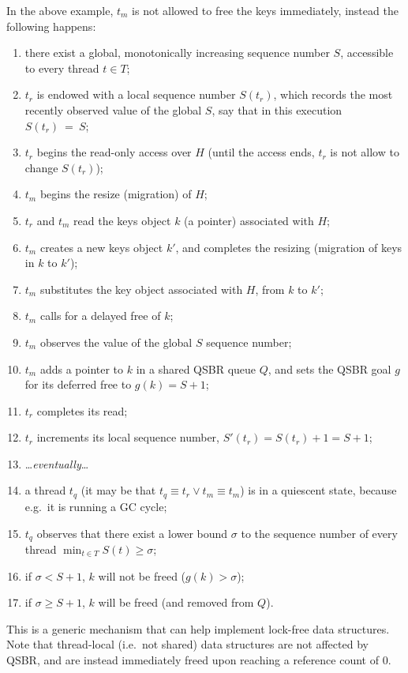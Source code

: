 In the above example, $t_m$ is not allowed to free the keys immediately, instead the following happens:
\begin{enumerate}
    \item there exist a global, monotonically increasing sequence number $S$, accessible to every thread $t \in T$;
    \item $t_r$ is endowed with a local sequence number $S(t_r)$, which records the most recently observed value of the global $S$, say that in this execution $S(t_r)~=~S$;
    \item $t_r$ begins the read-only access over $H$ (until the access ends, $t_r$ is not allow to change $S(t_r)$);
    \item $t_m$ begins the resize (migration) of $H$;
    \item $t_r$ and $t_m$ read the keys object $k$ (a pointer) associated with $H$;
    \item $t_m$ creates a new keys object $k'$, and completes the resizing (migration of keys in $k$ to $k'$);
    \item $t_m$ substitutes the key object associated with $H$, from $k$ to $k'$;
    \item $t_m$ calls for a delayed free of $k$;
    \item $t_m$ observes the value of the global $S$ sequence number;
    \item $t_m$ adds a pointer to $k$ in a shared QSBR queue $Q$, and sets the QSBR goal $g$ for its deferred free to $g(k) = S + 1$;
    \item $t_r$ completes its read;
    \item $t_r$ increments its local sequence number, $S'(t_r) = S(t_r) + 1 = S + 1$;
    \item \ldots\emph{eventually}\ldots
    \item a thread $t_q$ (it may be that $t_q \equiv t_r \vee t_m \equiv t_m$) is in a quiescent state, because e.g.\ it is running a GC cycle;
    \item $t_q$ observes that there exist a lower bound $\sigma$ to the sequence number of every thread $\min_{t \in T} S(t) \geq \sigma$;
    \item if $\sigma < S + 1$, $k$ will not be freed ($g(k) > \sigma$);
    \item if $\sigma \geq S + 1$, $k$ will be freed (and removed from $Q$).
\end{enumerate}

This is a generic mechanism that can help implement lock-free data structures.
Note that thread-local (i.e.\ not shared) data structures are not affected by QSBR, and are instead immediately freed upon reaching a reference count of 0.


